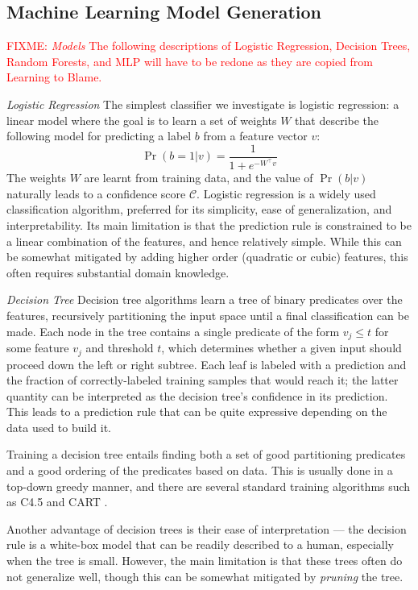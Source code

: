 \documentclass[conference]{IEEEtran}
\newcommand{\fixme}[1]{\textcolor{red}{FIXME: #1}}
\begin{document}
\subsection{Machine Learning Model Generation}
\label{sec-model}

\fixme{
\emph{Models} The following descriptions of Logistic Regression, Decision Trees,
Random Forests, and MLP will have to be redone as they are copied from Learning to Blame.
}

\emph{Logistic Regression}
The simplest classifier we investigate is logistic regression:
a linear model where the goal is to learn a set of weights $W$
that describe the following model for predicting a label
$b$ from a feature vector $v$:
%
\[ \Pr(b = 1 | v) = \frac{1}{1 + e^{-W^{\top} v}} \]
%
The weights $W$ are learnt from training data, and the value of
$\Pr(b | v)$ naturally leads to a confidence score $\mathcal{C}$.
%
Logistic regression is a widely used classification algorithm, preferred
for its simplicity, ease of generalization, and interpretability.
%
Its main limitation is that the prediction rule is constrained to be a
linear combination of the features, and hence relatively simple.
%
While this can be somewhat mitigated by adding higher order (quadratic
or cubic) features, this often requires substantial domain knowledge.

\emph{Decision Tree}
Decision tree algorithms learn a tree of binary predicates over the
features, recursively partitioning the input space until a final
classification can be made.
%
Each node in the tree contains a single predicate of the form
$v_j \leq t$ for some feature $v_j$ and threshold $t$, which determines
whether a given input should proceed down the left or right subtree.
%
Each leaf is labeled with a prediction and the fraction of
correctly-labeled training samples that would reach it; the latter
quantity can be interpreted as the decision tree's confidence in its
prediction.
%
This leads to a prediction rule that can be quite expressive depending
on the data used to build it.

Training a decision tree entails finding both a set of good partitioning
predicates and a good ordering of the predicates based on data.
%
This is usually done in a top-down greedy manner, and there are several
standard training algorithms such as C4.5 \cite{Quinlan1993-de} and
CART \cite{Breiman1984-qy}.

Another advantage of decision trees is their ease of interpretation ---
the decision rule is a white-box model that can be readily described to
a human, especially when the tree is small.
%
However, the main limitation is that these trees often do not generalize
well, though this can be somewhat mitigated by \emph{pruning} the tree.
\end{document}
